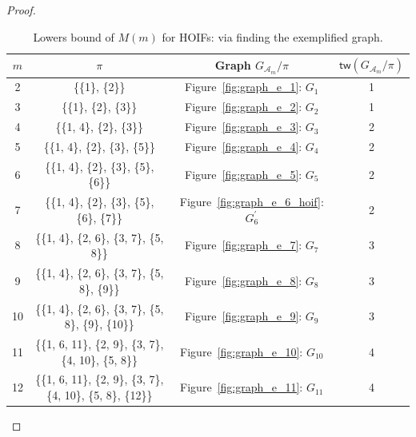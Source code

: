 \documentclass[twoside,11pt]{article}
\newcommand{\treewidthp}[1]{\mathsf{tw}(#1)}
\newcommand{\graphform}[1]{G_{#1}}
\def\calA{\mathcal{A}}
\begin{document}
\begin{proof}
\begin{table}[h]
\centering
\caption{Lowers bound of $M(m)$ for HOIFs: via finding the exemplified graph.}
\label{tab:HOIF_lower_bound}
\begin{tabular}{c c c c}
\toprule
$m$ & $\pi$ & Graph $\graphform{\calA_{m}} /\pi$ & $\treewidthp{\graphform{\calA_{m}} /\pi}$ \\
\midrule
2  & \{\{1\}, \{2\}\} & Figure~\ref{fig:graph_e_1}: $G_1$ & 1 \\
3  & \{\{1\}, \{2\}, \{3\}\} & Figure~\ref{fig:graph_e_2}: $G_2$ & 1 \\
4  & \{\{1, 4\}, \{2\}, \{3\}\} & Figure~\ref{fig:graph_e_3}: $G_3$ & 2 \\
5  & \{\{1, 4\}, \{2\}, \{3\}, \{5\}\} & Figure~\ref{fig:graph_e_4}: $G_4$ & 2 \\
6  & \{\{1, 4\}, \{2\}, \{3\}, \{5\}, \{6\}\} & Figure~\ref{fig:graph_e_5}: $G_5$ & 2 \\
7  & \{\{1, 4\}, \{2\}, \{3\}, \{5\}, \{6\}, \{7\}\} & Figure~\ref{fig:graph_e_6_hoif}: $G_6^{\prime}$ & 2 \\
8  & \{\{1, 4\}, \{2, 6\}, \{3, 7\}, \{5, 8\}\} & Figure~\ref{fig:graph_e_7}: $G_7$ & 3 \\
9  & \{\{1, 4\}, \{2, 6\}, \{3, 7\}, \{5, 8\}, \{9\}\} & Figure~\ref{fig:graph_e_8}: $G_8$ & 3 \\
10 & \{\{1, 4\}, \{2, 6\}, \{3, 7\}, \{5, 8\}, \{9\}, \{10\}\} & Figure~\ref{fig:graph_e_9}: $G_9$ & 3 \\
11 & \{\{1, 6, 11\}, \{2, 9\}, \{3, 7\}, \{4, 10\}, \{5, 8\}\} & Figure~\ref{fig:graph_e_10}: $G_{10}$ & 4 \\
12 & \{\{1, 6, 11\}, \{2, 9\}, \{3, 7\}, \{4, 10\}, \{5, 8\}, \{12\}\} & Figure~\ref{fig:graph_e_11}: $G_{11}$ & 4 \\
\bottomrule
\end{tabular}
\end{table}



\end{proof}
\end{document}
